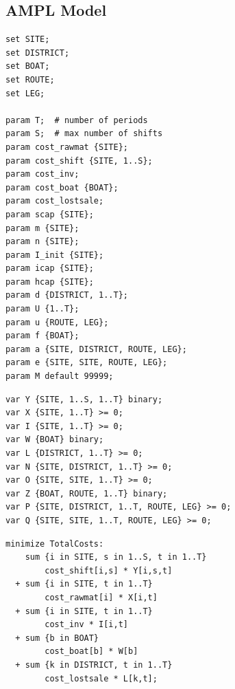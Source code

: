 \documentclass[10pt]{article}
\begin{document}
\subsection{AMPL Model}
\scriptsize
\begin{minipage}[t]{0.48\textwidth}
\begin{verbatim}
set SITE;
set DISTRICT;
set BOAT;
set ROUTE;
set LEG;

param T;  # number of periods
param S;  # max number of shifts
param cost_rawmat {SITE};
param cost_shift {SITE, 1..S};
param cost_inv;
param cost_boat {BOAT};
param cost_lostsale;
param scap {SITE};
param m {SITE};
param n {SITE};
param I_init {SITE};
param icap {SITE};
param hcap {SITE};
param d {DISTRICT, 1..T};
param U {1..T};
param u {ROUTE, LEG};
param f {BOAT};
param a {SITE, DISTRICT, ROUTE, LEG};
param e {SITE, SITE, ROUTE, LEG};
param M default 99999;
\end{verbatim}
\end{minipage}
\hfill
\begin{minipage}[t]{0.48\textwidth}
\begin{verbatim}
var Y {SITE, 1..S, 1..T} binary;
var X {SITE, 1..T} >= 0;
var I {SITE, 1..T} >= 0;
var W {BOAT} binary;
var L {DISTRICT, 1..T} >= 0;
var N {SITE, DISTRICT, 1..T} >= 0;
var O {SITE, SITE, 1..T} >= 0;
var Z {BOAT, ROUTE, 1..T} binary;
var P {SITE, DISTRICT, 1..T, ROUTE, LEG} >= 0;
var Q {SITE, SITE, 1..T, ROUTE, LEG} >= 0;
\end{verbatim}
\end{minipage}

\begin{verbatim}
minimize TotalCosts:
    sum {i in SITE, s in 1..S, t in 1..T}
        cost_shift[i,s] * Y[i,s,t]
  + sum {i in SITE, t in 1..T}
        cost_rawmat[i] * X[i,t]
  + sum {i in SITE, t in 1..T}
        cost_inv * I[i,t]
  + sum {b in BOAT}
        cost_boat[b] * W[b]
  + sum {k in DISTRICT, t in 1..T}
        cost_lostsale * L[k,t];
\end{verbatim}
\end{document}
